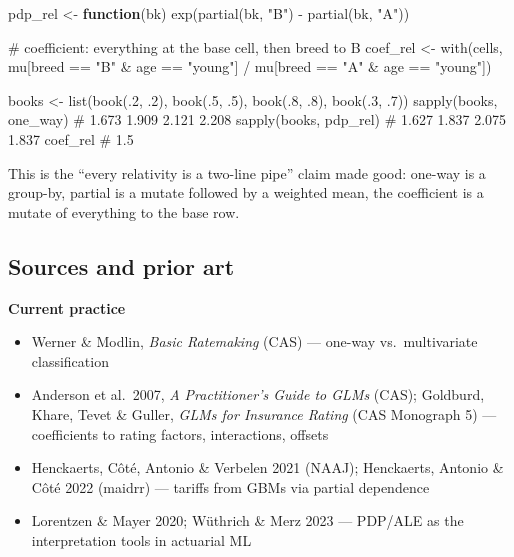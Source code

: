 \documentclass[
  letterpaper,
  DIV=11,
  numbers=noendperiod]{scrartcl}
\newenvironment{Shaded}{\begin{snugshade}}{\end{snugshade}}
\newcommand{\CommentTok}[1]{\textcolor[rgb]{0.37,0.37,0.37}{#1}}
\newcommand{\ControlFlowTok}[1]{\textcolor[rgb]{0.00,0.23,0.31}{\textbf{#1}}}
\newcommand{\DecValTok}[1]{\textcolor[rgb]{0.68,0.00,0.00}{#1}}
\newcommand{\FunctionTok}[1]{\textcolor[rgb]{0.28,0.35,0.67}{#1}}
\newcommand{\NormalTok}[1]{\textcolor[rgb]{0.00,0.23,0.31}{#1}}
\newcommand{\OtherTok}[1]{\textcolor[rgb]{0.00,0.23,0.31}{#1}}
\newcommand{\SpecialCharTok}[1]{\textcolor[rgb]{0.37,0.37,0.37}{#1}}
\newcommand{\StringTok}[1]{\textcolor[rgb]{0.13,0.47,0.30}{#1}}
\providecommand{\tightlist}{%
  \setlength{\itemsep}{0pt}\setlength{\parskip}{0pt}}
\begin{document}
\begin{Shaded}
\begin{Highlighting}[]
\NormalTok{pdp\_rel }\OtherTok{\textless{}{-}} \ControlFlowTok{function}\NormalTok{(bk) }\FunctionTok{exp}\NormalTok{(}\FunctionTok{partial}\NormalTok{(bk, }\StringTok{"B"}\NormalTok{) }\SpecialCharTok{{-}} \FunctionTok{partial}\NormalTok{(bk, }\StringTok{"A"}\NormalTok{))}

\CommentTok{\# coefficient: everything at the base cell, then breed to B}
\NormalTok{coef\_rel }\OtherTok{\textless{}{-}} \FunctionTok{with}\NormalTok{(cells, mu[breed }\SpecialCharTok{==} \StringTok{"B"} \SpecialCharTok{\&}\NormalTok{ age }\SpecialCharTok{==} \StringTok{"young"}\NormalTok{] }\SpecialCharTok{/}
\NormalTok{                        mu[breed }\SpecialCharTok{==} \StringTok{"A"} \SpecialCharTok{\&}\NormalTok{ age }\SpecialCharTok{==} \StringTok{"young"}\NormalTok{])}

\NormalTok{books }\OtherTok{\textless{}{-}} \FunctionTok{list}\NormalTok{(}\FunctionTok{book}\NormalTok{(.}\DecValTok{2}\NormalTok{, .}\DecValTok{2}\NormalTok{), }\FunctionTok{book}\NormalTok{(.}\DecValTok{5}\NormalTok{, .}\DecValTok{5}\NormalTok{), }\FunctionTok{book}\NormalTok{(.}\DecValTok{8}\NormalTok{, .}\DecValTok{8}\NormalTok{), }\FunctionTok{book}\NormalTok{(.}\DecValTok{3}\NormalTok{, .}\DecValTok{7}\NormalTok{))}
\FunctionTok{sapply}\NormalTok{(books, one\_way)   }\CommentTok{\# 1.673 1.909 2.121 2.208}
\FunctionTok{sapply}\NormalTok{(books, pdp\_rel)   }\CommentTok{\# 1.627 1.837 2.075 1.837}
\NormalTok{coef\_rel                 }\CommentTok{\# 1.5}
\end{Highlighting}
\end{Shaded}

This is the ``every relativity is a two-line pipe'' claim made good:
one-way is a group-by, partial is a mutate followed by a weighted mean,
the coefficient is a mutate of everything to the base row.

\subsection{Sources and prior art}\label{sources}

\textbf{Current practice}

\begin{itemize}
\tightlist
\item
  Werner \& Modlin, \emph{Basic Ratemaking} (CAS) --- one-way
  vs.~multivariate classification
\item
  Anderson et al.~2007, \emph{A Practitioner's Guide to GLMs} (CAS);
  Goldburd, Khare, Tevet \& Guller, \emph{GLMs for Insurance Rating}
  (CAS Monograph 5) --- coefficients to rating factors, interactions,
  offsets
\item
  Henckaerts, Côté, Antonio \& Verbelen 2021 (NAAJ); Henckaerts, Antonio
  \& Côté 2022 (maidrr) --- tariffs from GBMs via partial dependence
\item
  Lorentzen \& Mayer 2020; Wüthrich \& Merz 2023 --- PDP/ALE as the
  interpretation tools in actuarial ML
\end{itemize}
\end{document}
